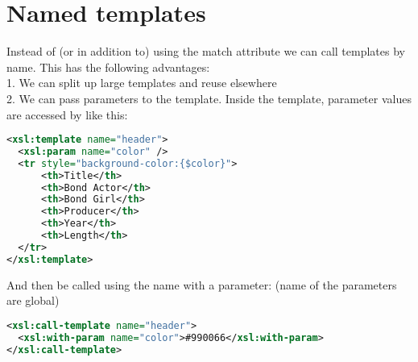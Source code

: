 \section{Named templates}
Instead of (or in addition to) using the match attribute we can call templates by name. This has the following advantages:\\
1. We can split up large templates and reuse elsewhere\\
2. We can pass parameters to the template. Inside the template,
parameter values are accessed by  like this:
\begin{lstlisting}[language=XML]
<xsl:template name="header">
  <xsl:param name="color" />
  <tr style="background-color:{$color}">
      <th>Title</th>
      <th>Bond Actor</th>
      <th>Bond Girl</th>
      <th>Producer</th>
      <th>Year</th>
      <th>Length</th>
  </tr>
</xsl:template>
\end{lstlisting}
And then be called using the name with a parameter: (name of the parameters are global)
\begin{lstlisting}[language=XML]
<xsl:call-template name="header">
  <xsl:with-param name="color">#990066</xsl:with-param>
</xsl:call-template>
\end{lstlisting}

